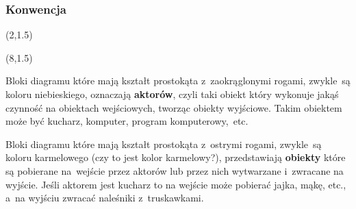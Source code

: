 \documentclass[10pt,t]{beamer}
\begin{document}
\begin{frame}
  \frametitle{Konwencja}


  \begin{textblock}{2.8}(2,1.5)


  \end{textblock}



  \begin{textblock}{2.8}(8,1.5)


  \end{textblock}


  \vspace{6em}





  Bloki diagramu które mają kształt prostokąta z~zaokrąglonymi rogami,
  zwykle~są koloru niebieskiego, oznaczają \textbf{aktorów}, czyli
  taki obiekt który wykonuje jakąś czynność na obiektach wejściowych,
  tworząc obiekty wyjściowe. Takim obiektem może być kucharz, komputer,
  program komputerowy,~etc.

  Bloki diagramu które mają kształt prostokąta z~ostrymi rogami, zwykle~są
  koloru karmelowego (czy to jest kolor karmelowy?), przedstawiają
  \textbf{obiekty} które są pobierane na~wejście przez aktorów lub przez
  nich wytwarzane i~zwracane na wyjście. Jeśli aktorem jest kucharz to na
  wejście może pobierać jajka, mąkę, etc., a~na wyjściu zwracać naleśniki
  z~truskawkami.

\end{frame}
\end{document}
